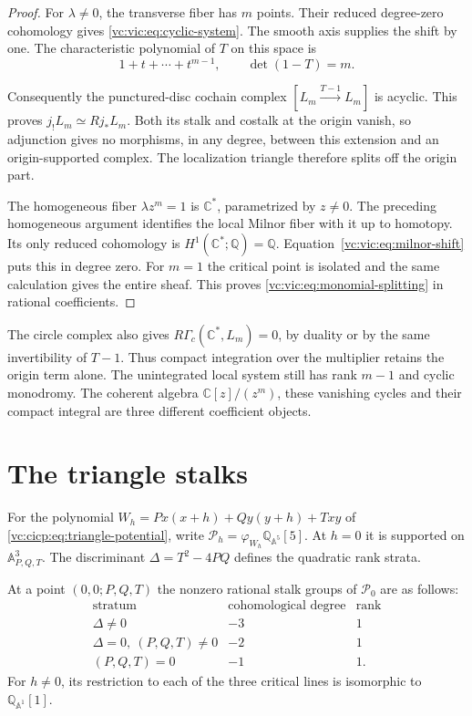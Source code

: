 \begin{proof}
For $\lambda\ne0$, the transverse fiber has $m$ points.
Their reduced degree-zero cohomology gives
\eqref{vc:vic:eq:cyclic-system}. The smooth axis supplies the
shift by one. The characteristic polynomial of $T$ on this
space is
\[
 1+t+\cdots+t^{m-1},\qquad \det(1-T)=m.
\]

Consequently the punctured-disc cochain complex
$[L_m\xrightarrow{T-1}L_m]$ is acyclic. This proves
$j_!L_m\simeq Rj_*L_m$. Both its stalk and costalk at the
origin vanish, so adjunction gives no morphisms, in any degree,
between this extension and an origin-supported complex.
The localization triangle therefore splits off the origin part.

The homogeneous fiber $\lambda z^m=1$ is $\mathbb C^*$,
parametrized by $z\ne0$. The preceding homogeneous argument
identifies the local Milnor fiber with it up to homotopy.
Its only reduced cohomology is
$H^1(\mathbb C^*;\mathbb Q)=\mathbb Q$.
Equation~\eqref{vc:vic:eq:milnor-shift} puts this in degree zero.
For $m=1$ the critical point is isolated and the same calculation
gives the entire sheaf. This proves
\eqref{vc:vic:eq:monomial-splitting} in rational coefficients.
\end{proof}

The circle complex also gives
$R\Gamma_c(\mathbb C^*,L_m)=0$, by duality or by the
same invertibility of $T-1$. Thus compact integration over
the multiplier retains the origin term alone.
The unintegrated local system still has rank $m-1$ and
cyclic monodromy. The coherent algebra $\mathbb C[z]/(z^m)$,
these vanishing cycles and their compact integral are three
different coefficient objects.

\section{The triangle stalks}

For the polynomial
$W_h=P x(x+h)+Q y(y+h)+Txy$ of
\eqref{vc:cicp:eq:triangle-potential}, write
$\mathcal P_h=\varphi_{W_h}\mathbb Q_{\mathbb A^5}[5]$.
At $h=0$ it is supported on $\mathbb A^3_{P,Q,T}$.
The discriminant $\Delta=T^2-4PQ$ defines the quadratic rank strata.

\begin{theorem}\label{vc:vic:thm:triangle-stalks}
At a point $(0,0;P,Q,T)$ the nonzero rational stalk groups of
$\mathcal P_0$ are as follows:
\begin{equation}\label{vc:vic:eq:stalk-table}
\begin{array}{c|c|c}
 \text{stratum}&\text{cohomological degree}&\text{rank}\\\hline
 \Delta\ne0&-3&1\\
 \Delta=0,\ (P,Q,T)\ne0&-2&1\\
 (P,Q,T)=0&-1&1.
\end{array}
\end{equation}
For $h\ne0$, its restriction to each of the three critical
lines is isomorphic to $\mathbb Q_{\mathbb A^1}[1]$.
\end{theorem}


